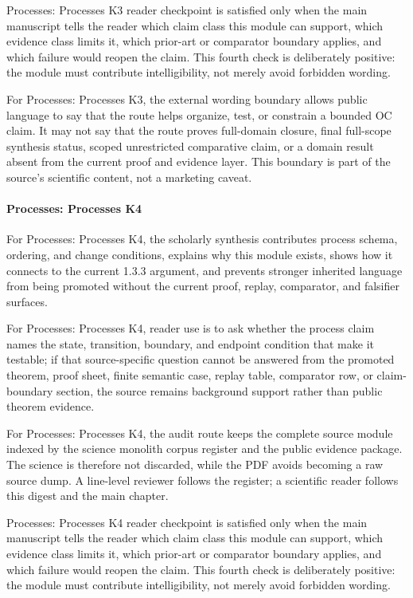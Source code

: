 Processes: Processes K3 reader checkpoint is satisfied only when the main manuscript tells the reader which claim class this module can support, which evidence class limits it, which prior-art or comparator boundary applies, and which failure would reopen the claim. This fourth check is deliberately positive: the module must contribute intelligibility, not merely avoid forbidden wording.


For Processes: Processes K3, the external wording boundary allows public language to say that the route helps organize, test, or constrain a bounded OC claim. It may not say that the route proves full-domain closure, final full-scope synthesis status, scoped unrestricted comparative claim, or a domain result absent from the current proof and evidence layer. This boundary is part of the source's scientific content, not a marketing caveat.


\paragraph{Processes: Processes K4}

For Processes: Processes K4, the scholarly synthesis contributes process schema, ordering, and change conditions, explains why this module exists, shows how it connects to the current 1.3.3 argument, and prevents stronger inherited language from being promoted without the current proof, replay, comparator, and falsifier surfaces.


For Processes: Processes K4, reader use is to ask whether the process claim names the state, transition, boundary, and endpoint condition that make it testable; if that source-specific question cannot be answered from the promoted theorem, proof sheet, finite semantic case, replay table, comparator row, or claim-boundary section, the source remains background support rather than public theorem evidence.


For Processes: Processes K4, the audit route keeps the complete source module indexed by the science monolith corpus register and the public evidence package. The science is therefore not discarded, while the PDF avoids becoming a raw source dump. A line-level reviewer follows the register; a scientific reader follows this digest and the main chapter.


Processes: Processes K4 reader checkpoint is satisfied only when the main manuscript tells the reader which claim class this module can support, which evidence class limits it, which prior-art or comparator boundary applies, and which failure would reopen the claim. This fourth check is deliberately positive: the module must contribute intelligibility, not merely avoid forbidden wording.


